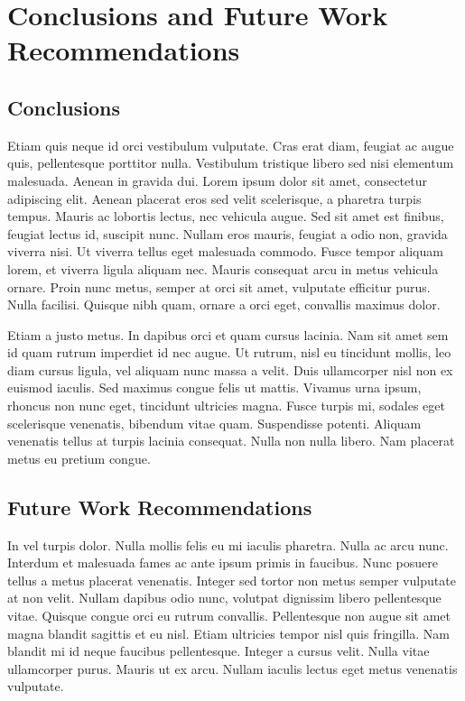 \chapter{Conclusions and Future Work Recommendations}
\section{Conclusions}
Etiam quis neque id orci vestibulum vulputate. Cras erat diam, feugiat ac augue quis, pellentesque porttitor nulla. Vestibulum tristique libero sed nisi elementum malesuada. Aenean in gravida dui. Lorem ipsum dolor sit amet, consectetur adipiscing elit. Aenean placerat eros sed velit scelerisque, a pharetra turpis tempus. Mauris ac lobortis lectus, nec vehicula augue. Sed sit amet est finibus, feugiat lectus id, suscipit nunc. Nullam eros mauris, feugiat a odio non, gravida viverra nisi. Ut viverra tellus eget malesuada commodo. Fusce tempor aliquam lorem, et viverra ligula aliquam nec. Mauris consequat arcu in metus vehicula ornare. Proin nunc metus, semper at orci sit amet, vulputate efficitur purus. Nulla facilisi. Quisque nibh quam, ornare a orci eget, convallis maximus dolor.

Etiam a justo metus. In dapibus orci et quam cursus lacinia. Nam sit amet sem id quam rutrum imperdiet id nec augue. Ut rutrum, nisl eu tincidunt mollis, leo diam cursus ligula, vel aliquam nunc massa a velit. Duis ullamcorper nisl non ex euismod iaculis. Sed maximus congue felis ut mattis. Vivamus urna ipsum, rhoncus non nunc eget, tincidunt ultricies magna. Fusce turpis mi, sodales eget scelerisque venenatis, bibendum vitae quam. Suspendisse potenti. Aliquam venenatis tellus at turpis lacinia consequat. Nulla non nulla libero. Nam placerat metus eu pretium congue.

\section{Future Work Recommendations}
In vel turpis dolor. Nulla mollis felis eu mi iaculis pharetra. Nulla ac arcu nunc. Interdum et malesuada fames ac ante ipsum primis in faucibus. Nunc posuere tellus a metus placerat venenatis. Integer sed tortor non metus semper vulputate at non velit. Nullam dapibus odio nunc, volutpat dignissim libero pellentesque vitae. Quisque congue orci eu rutrum convallis. Pellentesque non augue sit amet magna blandit sagittis et eu nisl. Etiam ultricies tempor nisl quis fringilla. Nam blandit mi id neque faucibus pellentesque. Integer a cursus velit. Nulla vitae ullamcorper purus. Mauris ut ex arcu. Nullam iaculis lectus eget metus venenatis vulputate.

